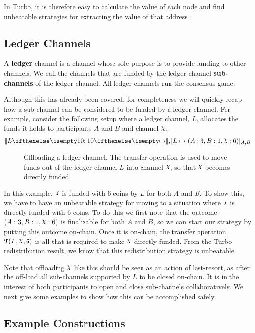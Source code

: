 In Turbo, it is therefore easy to calculate the value of each node and find unbeatable strategies for extracting the value of that address .

\subsection{Ledger Channels}

A \textbf{ledger} channel is a channel whose sole purpose is to provide funding to other channels.
We call the channels that are funded by the ledger channel \textbf{sub-channels} of the ledger channel.
All ledger channels run the consensus game.

Although this has already been covered, for completeness we will quickly recap how a sub-channel can be considered to be funded by a ledger channel.
For example, consider the following setup where a ledger channel, $L$, allocates the funds it holds to participants $A$ and $B$ and channel $\rchi$:
\begin{align}
  \adj{\holds{L}{10}{}}, \finalizable{L}{\alloc{A: 3, B: 1, \rchi: 6}}{A, B}
\end{align}
\begin{figure}[h]\centering
  \makebox[\textwidth][c]{}
  \caption{
    Offloading a ledger channel.
    The transfer operation is used to move funds out of the ledger channel $L$ into channel $\rchi$, so that $\rchi$ becomes directly funded.
  }\label{fig:ledger-offload}
\end{figure}
In this example, $\rchi$ is funded with 6 coins by $L$ for both $A$ and $B$.
To show this, we have to have an unbeatable strategy for moving to a situation where $\rchi$ is directly funded with 6 coins.
To do this we first note that the outcome $\alloc{A: 3, B: 1, \rchi: 6}$ is finalizable for both $A$ and $B$, so we can start our strategy by putting this outcome on-chain.
Once it is on-chain, the transfer operation $\transfer{L}{\rchi}{6}$ is all that is required to make $\rchi$ directly funded.
From the Turbo redistribution result, we know that this redistribution strategy is unbeatable.

Note that offloading $\rchi$ like this should be seen as an action of last-resort, as after the off-load all sub-channels supported by $L$ to be closed on-chain.
It is in the interest of both participants to open and close sub-channels collaboratively.
We next give some examples to show how this can be accomplished safely.

\subsection{Example Constructions}

